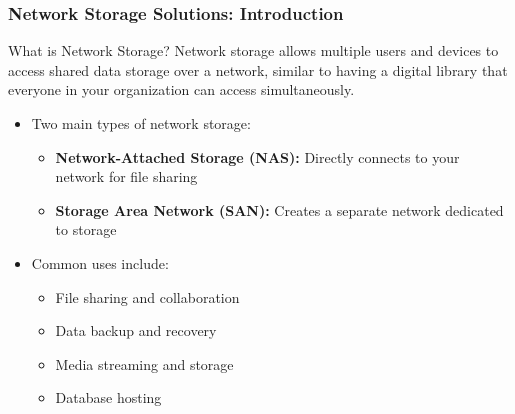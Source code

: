 \documentclass{beamer}
\begin{document}
\begin{frame}
    \frametitle{Network Storage Solutions: Introduction}
    
    \begin{alertblock}{What is Network Storage?}
        Network storage allows multiple users and devices to access shared data storage over a network, similar to having a digital library that everyone in your organization can access simultaneously.
    \end{alertblock}
    
    \begin{itemize}
        \item Two main types of network storage:
        \begin{itemize}
            \item \textbf{Network-Attached Storage (NAS):} 
                Directly connects to your network for file sharing
            
            \item \textbf{Storage Area Network (SAN):} 
                Creates a separate network dedicated to storage
        \end{itemize}
        
        \item Common uses include:
        \begin{itemize}
            \item File sharing and collaboration
            \item Data backup and recovery
            \item Media streaming and storage
            \item Database hosting
        \end{itemize}
    \end{itemize}
\end{frame}
\end{document}
